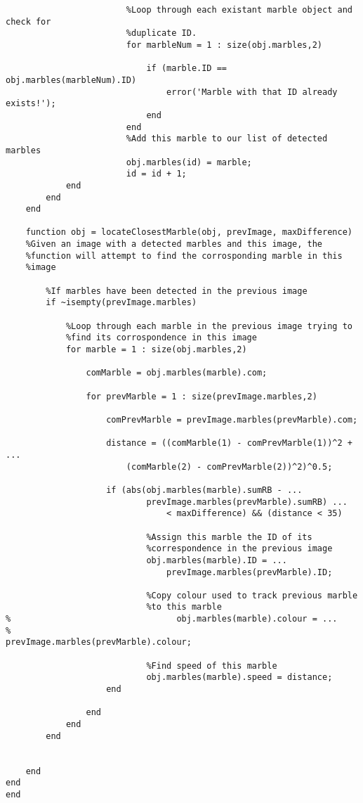 \documentclass[10pt,a4paper,onecolumn]{report}
\begin{document}
\begin{lstlisting}
                        %Loop through each existant marble object and check for
                        %duplicate ID.
                        for marbleNum = 1 : size(obj.marbles,2)

                            if (marble.ID == obj.marbles(marbleNum).ID)
                                error('Marble with that ID already exists!');
                            end
                        end
                        %Add this marble to our list of detected marbles
                        obj.marbles(id) = marble;
                        id = id + 1;
            end
        end
    end

    function obj = locateClosestMarble(obj, prevImage, maxDifference)
    %Given an image with a detected marbles and this image, the
    %function will attempt to find the corrosponding marble in this
    %image

        %If marbles have been detected in the previous image
        if ~isempty(prevImage.marbles)

            %Loop through each marble in the previous image trying to
            %find its corrospondence in this image
            for marble = 1 : size(obj.marbles,2)

                comMarble = obj.marbles(marble).com;

                for prevMarble = 1 : size(prevImage.marbles,2)

                    comPrevMarble = prevImage.marbles(prevMarble).com;

                    distance = ((comMarble(1) - comPrevMarble(1))^2 + ...
                        (comMarble(2) - comPrevMarble(2))^2)^0.5;

                    if (abs(obj.marbles(marble).sumRB - ...
                            prevImage.marbles(prevMarble).sumRB) ...
                                < maxDifference) && (distance < 35)

                            %Assign this marble the ID of its
                            %correspondence in the previous image
                            obj.marbles(marble).ID = ...
                                prevImage.marbles(prevMarble).ID;

                            %Copy colour used to track previous marble 
                            %to this marble
%                                 obj.marbles(marble).colour = ...
%                                     prevImage.marbles(prevMarble).colour;

                            %Find speed of this marble
                            obj.marbles(marble).speed = distance; 
                    end

                end
            end
        end


    end
end  
end
\end{lstlisting}
\end{document}
